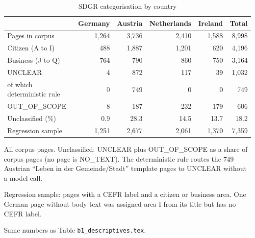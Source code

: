 \begin{table}[htbp]
\centering
\begin{threeparttable}
\caption{SDGR categorisation by country}
\label{tab:sdgr-counts}
\begin{tabular}{lrrrrr}
\hline
 & Germany & Austria & Netherlands & Ireland & Total \\
\hline
Pages in corpus & 1,264 & 3,736 & 2,410 & 1,588 & 8,998 \\
\hline
Citizen (A to I) & 488 & 1,887 & 1,201 & 620 & 4,196 \\
Business (J to Q) & 764 & 790 & 860 & 750 & 3,164 \\
UNCLEAR & 4 & 872 & 117 & 39 & 1,032 \\
\quad of which deterministic rule & 0 & 749 & 0 & 0 & 749 \\
OUT\_OF\_SCOPE & 8 & 187 & 232 & 179 & 606 \\
Unclassified (\%) & 0.9 & 28.3 & 14.5 & 13.7 & 18.2 \\
\hline
Regression sample & 1,251 & 2,677 & 2,061 & 1,370 & 7,359 \\
\hline
\end{tabular}
\begin{tablenotes}
\footnotesize
\item All corpus pages. Unclassified: UNCLEAR plus OUT\_OF\_SCOPE as a share of corpus pages (no page is NO\_TEXT). The deterministic rule routes the 749 Austrian ``Leben in der Gemeinde/Stadt'' template pages to UNCLEAR without a model call.
\item Regression sample: pages with a CEFR label and a citizen or business area. One German page without body text was assigned area I from its title but has no CEFR label.
\item Same numbers as Table \texttt{b1\_descriptives.tex}.
\end{tablenotes}
\end{threeparttable}
\end{table}
